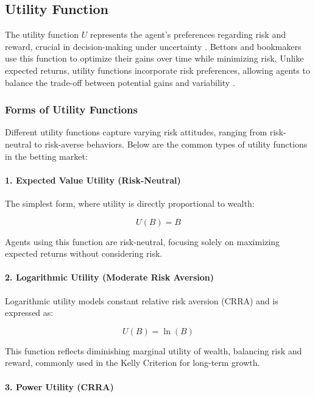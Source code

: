 \subsection{Utility Function}

The utility function \( U \) represents the agent's preferences regarding risk and reward, crucial in decision-making under uncertainty \cite{KahnemanTversky1979}. Bettors and bookmakers use this function to optimize their gains over time while minimizing risk. Unlike expected returns, utility functions incorporate risk preferences, allowing agents to balance the trade-off between potential gains and variability 
\cite{Markowitz1952} \cite{Arrow1971} \cite{Pratt1964}.

\subsubsection{Forms of Utility Functions}

Different utility functions capture varying risk attitudes, ranging from risk-neutral to risk-averse behaviors. Below are the common types of utility functions in the betting market:

\paragraph{1. Expected Value Utility (Risk-Neutral)}

The simplest form, where utility is directly proportional to wealth:

\[
U(B) = B
\]

Agents using this function are risk-neutral, focusing solely on maximizing expected returns without considering risk.

\paragraph{2. Logarithmic Utility (Moderate Risk Aversion)}

Logarithmic utility models constant relative risk aversion (CRRA) and is expressed as:

\[
U(B) = \ln(B)
\]

This function reflects diminishing marginal utility of wealth, balancing risk and reward, commonly used in the Kelly Criterion \cite{Kelly1956} \cite{Thorp1975} for long-term growth.

\paragraph{3. Power Utility (CRRA)}

